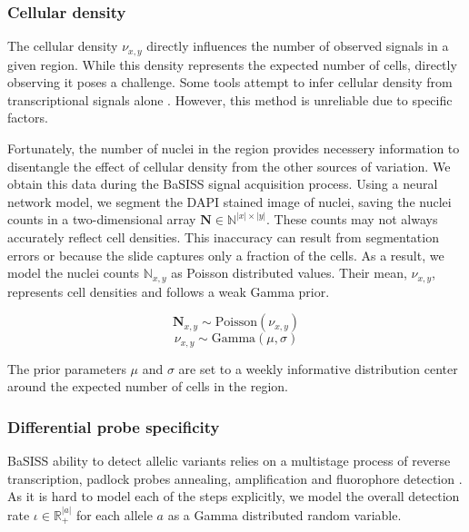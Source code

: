 \subsubsection*{Cellular density}
The cellular density $\nu_{x,y}$ directly influences the number of observed signals in a given region. While this density represents the expected number of cells, directly observing it poses a challenge. Some tools attempt to infer cellular density from transcriptional signals alone \parencite{Kleshchevnikov2022-ch}. However, this method is unreliable due to  specific factors.

Fortunately, the number of nuclei in the region provides necessery information to disentangle the effect of cellular density from the other sources of variation. We obtain this data during the \ac{BaSISS} signal acquisition process. Using a neural network model, we segment the DAPI stained image of nuclei, saving the nuclei counts in a two-dimensional array $\mathbf{N} \in \mathbb{N}^{|x| \times |y|}$. These counts may not always accurately reflect cell densities. This inaccuracy can result from segmentation errors or because the slide captures only a fraction of the cells. As a result, we model the nuclei counts $\mathbb{N}_{x,y}$ as Poisson distributed values. Their mean, $\nu_{x,y}$, represents cell densities and follows a weak Gamma prior.

\begin{equation}
    \mathbf{N}_{x,y} \sim \text{Poisson}({\nu}_{x,y})
\end{equation}
\begin{equation}
    {\nu}_{x,y} \sim \text{Gamma}(\mu, \sigma)
\end{equation}

The prior parameters $\mu$ and $\sigma$ are set to a weekly informative distribution center around the expected number of cells in the region.

\subsubsection*{Differential probe specificity}

\ac{BaSISS} ability to detect allelic variants relies on a multistage process of reverse transcription, padlock probes annealing, amplification and fluorophore detection \parencite{Svedlund2019-xb}. As it is hard to model each of the steps explicitly, we model the overall detection rate $\iota \in \mathbb{R}^{|a|}_{+}$ for each allele $a$ as a Gamma distributed random variable.


